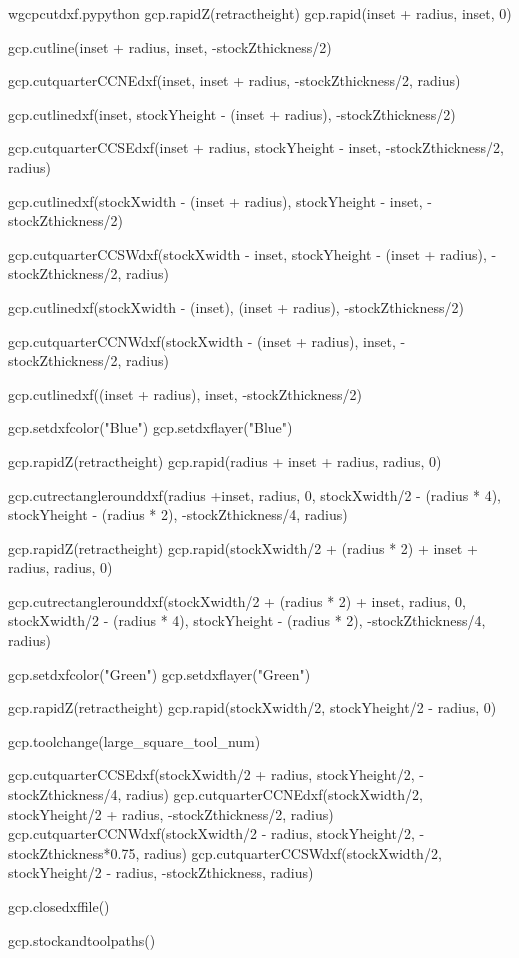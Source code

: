 \documentclass{ltxdoc}
\begin{document}
\begin{writecode}{w}{gcpcutdxf.py}{python}
gcp.rapidZ(retractheight)
gcp.rapid(inset + radius, inset, 0)

gcp.cutline(inset + radius, inset, -stockZthickness/2)

gcp.cutquarterCCNEdxf(inset, inset + radius, -stockZthickness/2, radius)

gcp.cutlinedxf(inset, stockYheight - (inset + radius), -stockZthickness/2)

gcp.cutquarterCCSEdxf(inset + radius, stockYheight - inset, -stockZthickness/2, radius)

gcp.cutlinedxf(stockXwidth - (inset + radius), stockYheight - inset, -stockZthickness/2)

gcp.cutquarterCCSWdxf(stockXwidth - inset, stockYheight - (inset + radius), -stockZthickness/2, radius)

gcp.cutlinedxf(stockXwidth - (inset), (inset + radius), -stockZthickness/2)

gcp.cutquarterCCNWdxf(stockXwidth - (inset + radius), inset, -stockZthickness/2, radius)

gcp.cutlinedxf((inset + radius), inset, -stockZthickness/2)

gcp.setdxfcolor("Blue")
gcp.setdxflayer("Blue")

gcp.rapidZ(retractheight)
gcp.rapid(radius + inset + radius, radius, 0)

gcp.cutrectanglerounddxf(radius +inset, radius, 0, stockXwidth/2 - (radius * 4), stockYheight - (radius * 2), -stockZthickness/4, radius)

gcp.rapidZ(retractheight)
gcp.rapid(stockXwidth/2 + (radius * 2) + inset + radius, radius, 0)

gcp.cutrectanglerounddxf(stockXwidth/2 + (radius * 2) + inset, radius, 0, stockXwidth/2 - (radius * 4), stockYheight - (radius * 2), -stockZthickness/4, radius)

gcp.setdxfcolor("Green")
gcp.setdxflayer("Green")

gcp.rapidZ(retractheight)
gcp.rapid(stockXwidth/2, stockYheight/2 - radius, 0)

gcp.toolchange(large_square_tool_num)

gcp.cutquarterCCSEdxf(stockXwidth/2 + radius, stockYheight/2, -stockZthickness/4, radius)
gcp.cutquarterCCNEdxf(stockXwidth/2, stockYheight/2 + radius, -stockZthickness/2, radius)
gcp.cutquarterCCNWdxf(stockXwidth/2 - radius, stockYheight/2, -stockZthickness*0.75, radius)
gcp.cutquarterCCSWdxf(stockXwidth/2, stockYheight/2 - radius, -stockZthickness, radius)

gcp.closedxffile()

gcp.stockandtoolpaths()

\end{writecode}
\end{document}
